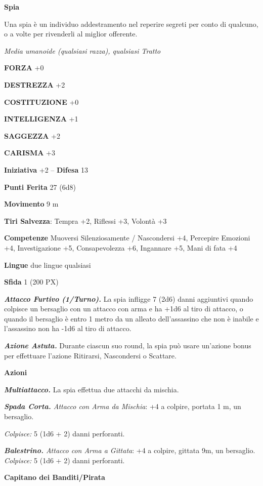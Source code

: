 \begin{multicols}{2}
	\medskip\textbf{Spia}

	Una spia è un individuo addestramento nel reperire segreti per conto di qualcuno, o a volte per rivenderli al miglior offerente.

	\textit{Media umanoide (qualsiasi razza), qualsiasi Tratto}

	\textbf{FORZA} +0

	\textbf{DESTREZZA} +2

	\textbf{COSTITUZIONE} +0

	\textbf{INTELLIGENZA} +1

	\textbf{SAGGEZZA} +2

	\textbf{CARISMA} +3

	\textbf{Iniziativa} +2 -- \textbf{Difesa} 13

	\textbf{Punti Ferita} 27 (6d8)

	\textbf{Movimento} 9 m

	\textbf{Tiri Salvezza}: Tempra +2, Riflessi +3, Volontà +3

	\textbf{Competenze} Muoversi Silenziosamente / Nascondersi +4, Percepire Emozioni +4, Investigazione +5, Consapevolezza +6, Ingannare +5, Mani di fata +4

	\textbf{Lingue} due lingue qualsiasi

	\textbf{Sfida} 1 (200 PX)

	\textit{\textbf{Attacco Furtivo (1/Turno).}} La spia infligge 7 (2d6) danni aggiuntivi quando colpisce un bersaglio con un attacco con arma e ha +1d6 al tiro di attacco, o quando il bersaglio è entro 1 metro da un alleato dell'assassino che non è inabile e l'assassino non ha -1d6 al tiro di attacco.

	\textit{\textbf{Azione Astuta.}} Durante ciascun suo round, la spia può usare un'azione bonus per effettuare l'azione Ritirarsi, Nascondersi o Scattare.

	\textbf{Azioni}

	\textit{\textbf{Multiattacco.}} La spia effettua due attacchi da mischia.

	\textit{\textbf{Spada Corta.} Attacco con Arma da Mischia}: +4 a colpire, portata 1 m, un bersaglio.

	\textit{Colpisce:} 5 (1d6 + 2) danni perforanti.

	\textit{\textbf{Balestrino.} Attacco con Arma a Gittata}: +4 a colpire, gittata 9m, un bersaglio. \textit{Colpisce:} 5 (1d6 + 2) danni perforanti.


	\medskip\textbf{Capitano dei Banditi/Pirata}


\end{multicols}

